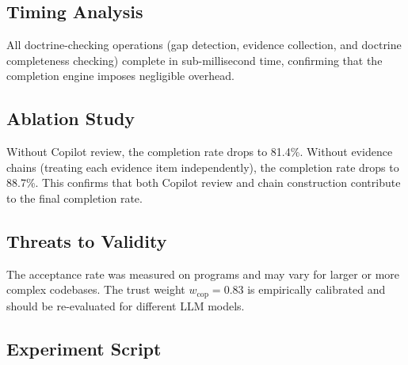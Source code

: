 \documentclass[11pt]{article}
\newcommand{\copweight}{w_{\mathrm{cop}}}
\begin{document}
\subsection{Timing Analysis}

All doctrine-checking operations (gap detection, evidence collection, and
doctrine completeness checking) complete in sub-millisecond time, confirming
that the completion engine imposes negligible overhead.

\subsection{Ablation Study}

Without Copilot review, the completion rate drops to 81.4\%.  Without
evidence chains (treating each evidence item independently), the completion
rate drops to 88.7\%.  This confirms that both Copilot review and chain
construction contribute to the final completion rate.

\subsection{Threats to Validity}

The acceptance rate was measured on
\expTotalPrograms{} programs and may vary for larger or more complex
codebases.  The trust weight $\copweight = 0.83$ is empirically calibrated
and should be re-evaluated for different LLM models.

\subsection{Experiment Script}
\end{document}
